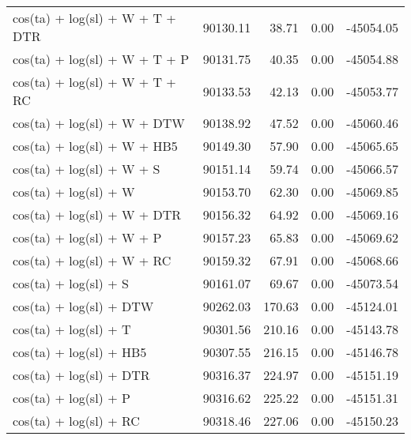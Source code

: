 \begin{tabular}{lrrrr}
  cos(ta) + log(sl) + W + T + DTR & 90130.11 & 38.71 & 0.00 & -45054.05 \\ 
  cos(ta) + log(sl) + W + T + P & 90131.75 & 40.35 & 0.00 & -45054.88 \\ 
  cos(ta) + log(sl) + W + T + RC & 90133.53 & 42.13 & 0.00 & -45053.77 \\ 
  cos(ta) + log(sl) + W + DTW & 90138.92 & 47.52 & 0.00 & -45060.46 \\ 
  cos(ta) + log(sl) + W + HB5 & 90149.30 & 57.90 & 0.00 & -45065.65 \\ 
  cos(ta) + log(sl) + W + S & 90151.14 & 59.74 & 0.00 & -45066.57 \\ 
  cos(ta) + log(sl) + W & 90153.70 & 62.30 & 0.00 & -45069.85 \\ 
  cos(ta) + log(sl) + W + DTR & 90156.32 & 64.92 & 0.00 & -45069.16 \\ 
  cos(ta) + log(sl) + W + P & 90157.23 & 65.83 & 0.00 & -45069.62 \\ 
  cos(ta) + log(sl) + W + RC & 90159.32 & 67.91 & 0.00 & -45068.66 \\ 
  cos(ta) + log(sl) + S & 90161.07 & 69.67 & 0.00 & -45073.54 \\ 
  cos(ta) + log(sl) + DTW & 90262.03 & 170.63 & 0.00 & -45124.01 \\ 
  cos(ta) + log(sl) + T & 90301.56 & 210.16 & 0.00 & -45143.78 \\ 
  cos(ta) + log(sl) + HB5 & 90307.55 & 216.15 & 0.00 & -45146.78 \\ 
  cos(ta) + log(sl) + DTR & 90316.37 & 224.97 & 0.00 & -45151.19 \\ 
  cos(ta) + log(sl) + P & 90316.62 & 225.22 & 0.00 & -45151.31 \\ 
  cos(ta) + log(sl) + RC & 90318.46 & 227.06 & 0.00 & -45150.23 \\ 
   \bottomrule
\end{tabular}

